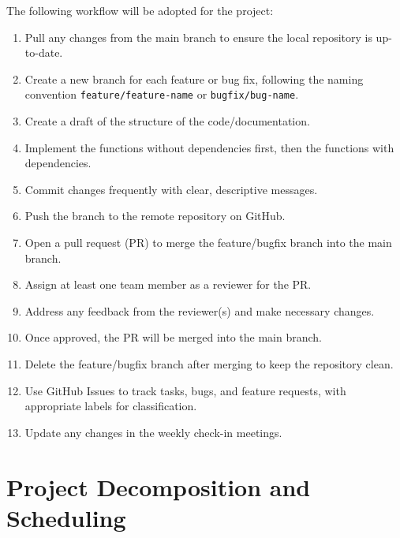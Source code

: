 \documentclass{article}
\begin{document}
The following workflow will be adopted for the project:
\begin{enumerate}
    \item Pull any changes from the main branch to ensure the local repository is up-to-date.
    \item Create a new branch for each feature or bug fix, following the naming convention \texttt{feature/feature-name} or \texttt{bugfix/bug-name}.
    \item Create a draft of the structure of the code/documentation. 
    \item Implement the functions without dependencies first, then the functions with dependencies.
    \item Commit changes frequently with clear, descriptive messages.
    \item Push the branch to the remote repository on GitHub.
    \item Open a pull request (PR) to merge the feature/bugfix branch into the main branch.
    \item Assign at least one team member as a reviewer for the PR.
    \item Address any feedback from the reviewer(s) and make necessary changes.
    \item Once approved, the PR will be merged into the main branch.
    \item Delete the feature/bugfix branch after merging to keep the repository clean.
    \item Use GitHub Issues to track tasks, bugs, and feature requests, with appropriate labels for classification.
    \item Update any changes in the weekly check-in meetings.
\end{enumerate}

\section{Project Decomposition and Scheduling}
\end{document}

